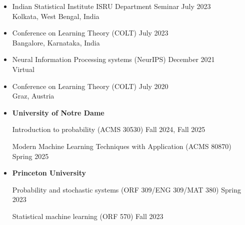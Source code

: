 \documentclass[letterpaper,12pt,oneside]{article}
\theoremstyle{definition}
\begin{document}
\begin{itemize}
				\item[] Indian Statistical Institute ISRU Department Seminar \hfill July 2023\\
				Kolkata, West Bengal, India
				
				\item[] Conference on Learning Theory (COLT) \hfill July 2023\\
				Bangalore, Karnataka, India
				
				\item[] Neural Information Processing systems (NeurIPS) \hfill December 2021\\
				Virtual
				
				\item[] Conference on Learning Theory (COLT) \hfill July 2020\\
				Graz, Austria
				
			\end{itemize}
			
			
			\begin{itemize}
				
				\item[] {\bf University of Notre Dame} 
				
				{Introduction to probability} (ACMS 30530) \hfill Fall 2024, Fall 2025
				
				{Modern Machine Learning Techniques with Application} (ACMS 80870) \hfill Spring 2025
				
				\item[] {\bf Princeton University} 
				
				{Probability and stochastic systems} (ORF 309/ENG 309/MAT 380) \hfill Spring 2023
				
				{Statistical machine learning} (ORF 570)  \hfill Fall 2023\\
			\end{itemize}
			
\end{document}
